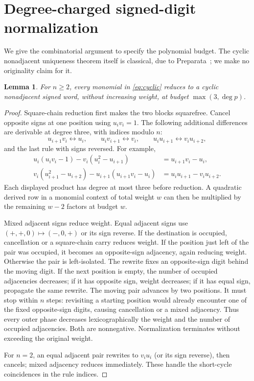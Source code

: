 \documentclass[11pt]{article}
\newtheorem{lemma}[theorem]{Lemma}
\theoremstyle{remark}\newtheorem{remark}[theorem]{Remark}
\begin{document}
\section{Degree-charged signed-digit normalization}
We give the combinatorial argument to specify the polynomial budget.
The cyclic nonadjacent uniqueness theorem itself is classical, due to
Preparata~\cite{preparata}; we make no originality claim for it.

\begin{lemma}\label{lem:rewrite}
For $n\ge2$, every monomial in \eqref{eq:cyclic} reduces to a cyclic nonadjacent signed
word, without increasing weight, at budget $\max(3,\deg p)$.
\end{lemma}
\begin{proof}
Square-chain reduction first makes the two blocks squarefree. Cancel opposite
signs at one position using $u_iv_i=1$. The following additional differences
are derivable at degree three, with indices modulo $n$:
\[
 u_{i+1}v_i\leftrightarrow u_i,\qquad
 u_iv_{i+1}\leftrightarrow v_i,\qquad
 u_iu_{i+1}\leftrightarrow v_iu_{i+2},
\]
and the last rule with signs reversed. For example,
\begin{align*}
 u_i(u_iv_i-1)-v_i(u_i^2-u_{i+1})&=u_{i+1}v_i-u_i,\\
 v_i(u_{i+1}^2-u_{i+2})
 -u_{i+1}(u_{i+1}v_i-u_i)&=u_iu_{i+1}-v_iu_{i+2}.
\end{align*}
Each displayed product has degree at most three before reduction. A
quadratic derived row in a monomial context of total weight $w$ can then
be multiplied by the remaining $w-2$ factors at budget $w$.

Mixed adjacent signs reduce weight. Equal adjacent signs use
$(+,+,0)\mapsto(-,0,+)$ or its sign reverse. If the destination is
occupied, cancellation or a square-chain carry reduces weight. If the
position just left of the pair was occupied, it becomes an opposite-sign
adjacency, again reducing weight. Otherwise the pair is left-isolated.
The rewrite fixes an opposite-sign digit behind the moving digit. If the
next position is empty, the number of occupied adjacencies decreases; if
it has opposite sign, weight decreases; if it has equal sign, propagate
the same rewrite. The moving pair advances by two positions. It must stop
within $n$ steps: revisiting a starting position would already encounter
one of the fixed opposite-sign digits, causing cancellation or a mixed
adjacency. Thus every outer phase decreases lexicographically the weight
and the number of occupied adjacencies. Both are nonnegative. Normalization
terminates without exceeding the original weight.

For $n=2$, an equal adjacent pair rewrites to $v_iu_i$ (or its sign
reverse), then cancels; mixed adjacency reduces immediately. These handle
the short-cycle coincidences in the rule indices.
\end{proof}
\end{document}
